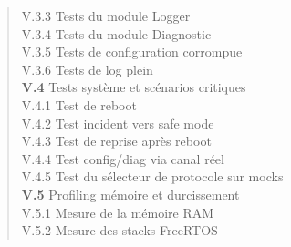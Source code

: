 \begin{quote}
\hspace{2.5em} V.3.3 \hspace{0.5em} Tests du module Logger \dotfill \pageref{subsec:t_logger}\\
\hspace{2.5em} V.3.4 \hspace{0.5em} Tests du module Diagnostic \dotfill \pageref{subsec:t_diag}\\
\hspace{2.5em} V.3.5 \hspace{0.5em} Tests de configuration corrompue \dotfill \pageref{subsec:t_corrupt}\\
\hspace{2.5em} V.3.6 \hspace{0.5em} Tests de log plein \dotfill \pageref{subsec:t_logfull}\\
\textbf{V.4} \hspace{1em} Tests système et scénarios critiques \dotfill \pageref{sec:sys_tests}\\
\hspace{2.5em} V.4.1 \hspace{0.5em} Test de reboot \dotfill \pageref{subsec:t_reboot}\\
\hspace{2.5em} V.4.2 \hspace{0.5em} Test incident vers safe mode \dotfill \pageref{subsec:t_safe}\\
\hspace{2.5em} V.4.3 \hspace{0.5em} Test de reprise après reboot \dotfill \pageref{subsec:t_resume}\\
\hspace{2.5em} V.4.4 \hspace{0.5em} Test config/diag via canal réel \dotfill \pageref{subsec:t_canal}\\
\hspace{2.5em} V.4.5 \hspace{0.5em} Test du sélecteur de protocole sur mocks \dotfill \pageref{subsec:t_proto}\\
\textbf{V.5} \hspace{1em} Profiling mémoire et durcissement \dotfill \pageref{sec:profiling}\\
\hspace{2.5em} V.5.1 \hspace{0.5em} Mesure de la mémoire RAM \dotfill \pageref{subsec:ram}\\
\hspace{2.5em} V.5.2 \hspace{0.5em} Mesure des stacks FreeRTOS \dotfill \pageref{subsec:stacks}\\

\end{quote}
